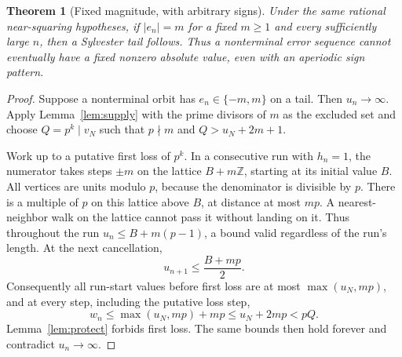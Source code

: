 \documentclass[11pt]{article}
\newtheorem{theorem}{Theorem}
\newcommand{\Z}{\mathbb Z}
\begin{document}
\begin{theorem}[Fixed magnitude, with arbitrary signs]\label{thm:magnitude}
Under the same rational near-squaring hypotheses, if $|e_n|=m$ for
a fixed $m\ge1$ and every sufficiently large $n$, then a Sylvester
tail follows. Thus a nonterminal error sequence cannot eventually have
a fixed nonzero absolute value, even with an aperiodic sign pattern.
\end{theorem}
\begin{proof}
Suppose a nonterminal orbit has $e_n\in\{-m,m\}$ on a tail. Then
$u_n\to\infty$. Apply Lemma~\ref{lem:supply} with the prime divisors
of $m$ as the excluded set and choose $Q=p^k\mid v_N$ such that
$p\nmid m$ and $Q>u_N+2m+1$.

Work up to a putative first loss of $p^k$. In a consecutive run with
$h_n=1$, the numerator takes steps $\pm m$ on the lattice
$B+m\Z$, starting at its initial value $B$. All vertices are units
modulo $p$, because the denominator is divisible by $p$. There is a
multiple of $p$ on this lattice above $B$, at distance at most $mp$.
A nearest-neighbor walk on the lattice cannot pass it without landing
on it. Thus throughout the run $u_n\le B+m(p-1)$, a bound valid
regardless of the run's length. At the next cancellation,
\[
 u_{n+1}\le\frac{B+mp}{2}.
\]
Consequently all run-start values before first loss are at most
$\max(u_N,mp)$, and at every step, including the putative loss step,
\[
 w_n\le\max(u_N,mp)+mp\le u_N+2mp<pQ.
\]
Lemma~\ref{lem:protect} forbids first loss. The same bounds then hold
forever and contradict $u_n\to\infty$.
\end{proof}
\end{document}
